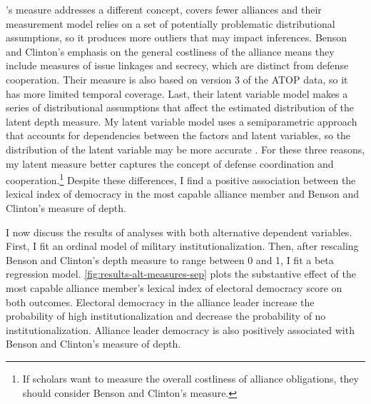 \documentclass[12pt]{article}
\begin{document}
\citet{BensonClinton2016}'s measure addresses a different concept, covers fewer alliances and their measurement model relies on a set of potentially problematic distributional assumptions, so it produces more outliers that may impact inferences.
Benson and Clinton's emphasis on the general costliness of the alliance means they include measures of issue linkages and secrecy, which are distinct from defense cooperation. 
Their measure is also based on version 3 of the ATOP data, so it has more limited temporal coverage. 
Last, their latent variable model makes a series of distributional assumptions that affect the estimated distribution of the latent depth measure. 
My latent variable model uses a semiparametric approach that accounts for dependencies between the factors and latent variables, so the distribution of the latent variable may be more accurate \citep{Murrayetal2013}.
For these three reasons, my latent measure better captures the concept of defense coordination and cooperation.\footnote{If scholars want to measure the overall costliness of alliance obligations, they should consider Benson and Clinton's measure.} 
Despite these differences, I find a positive association between the lexical index of democracy in the most capable alliance member and Benson and Clinton's measure of depth. 


I now discuss the results of analyses with both alternative dependent variables. 
First, I fit an ordinal model of military institutionalization. 
Then, after rescaling Benson and Clinton's depth measure to range between 0 and 1, I fit a beta regression model. 
\autoref{fig:results-alt-measures-sep} plots the substantive effect of the most capable alliance member's lexical index of electoral democracy score on both outcomes. 
Electoral democracy in the alliance leader increase the probability of high institutionalization and decrease the probability of no institutionalization. 
Alliance leader democracy is also positively associated with Benson and Clinton's measure of depth. 
\end{document}
